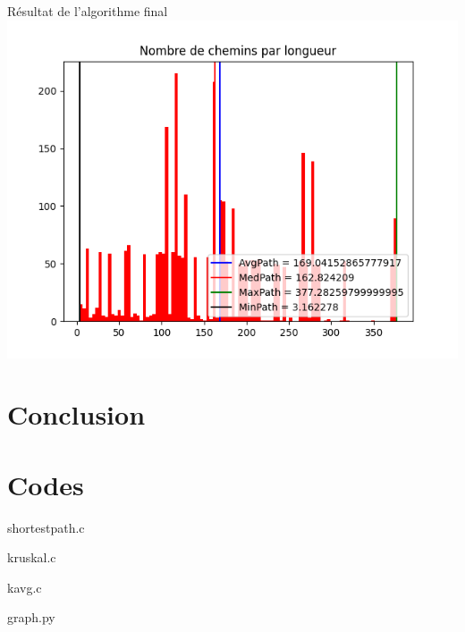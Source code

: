 \documentclass[aspectratio=43,11pt]{beamer}
\begin{document}
\begin{frame}{Résultat de l'algorithme final}
    \centering
        \includegraphics[height=0.8\textheight]{k_k_r}
\end{frame}
\section{Conclusion}
\UseRawInputEncoding
\section{Codes}
\begin{frame}[allowframebreaks]{shortestpath.c}
     
\end{frame}
\begin{frame}[allowframebreaks]{kruskal.c}
     
\end{frame}
\begin{frame}[allowframebreaks]{kavg.c}
     
\end{frame}
\begin{frame}[allowframebreaks]{graph.py}
     
\end{frame}
\end{document}
